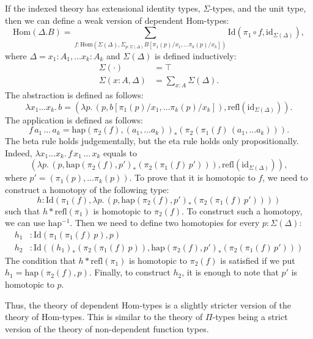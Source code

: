 \documentclass[reqno]{amsart}
\theoremstyle{definition}
\theoremstyle{remark}
\newcommand{\fs}[1]{\mathrm{#1}}
\newcommand{\Hom}{\fs{Hom}}
\newcommand{\Id}{\fs{Id}}
\newcommand{\refl}{\fs{refl}}
\newcommand{\id}{\fs{id}}
\numberwithin{figure}{section}
\begin{document}
If the indexed theory has extensional identity types, $\Sigma$-types, and the unit type, then we can define a weak version of dependent $\Hom$-types:
\[ \Hom(\Delta.B) = \sum_{f : \Hom(\Sigma(\Delta),\Sigma_{p : \Sigma(\Delta)} B[\pi_1(p)/x_1, \ldots \pi_k(p)/x_k])} \Id(\pi_1 \circ f, \id_{\Sigma(\Delta)}), \]
where $\Delta = x_1 : A_1, \ldots x_k : A_k$ and $\Sigma(\Delta)$ is defined inductively:
\begin{align*}
\Sigma(\cdot) & = \top \\
\Sigma(x : A, \Delta) & = \sum_{x : A} \Sigma(\Delta).
\end{align*}
The abstraction is defined as follows:
\[ \lambda x_1 \ldots x_k.\,b = (\lambda p.\,(p, b[\pi_1(p)/x_1, \ldots \pi_k(p)/x_k]), \refl(\id_{\Sigma(\Delta)})). \]
The application is defined as follows:
\[ f\,a_1\,\ldots\,a_k = \fs{hap}(\pi_2(f),(a_1, \ldots a_k))_*(\pi_2(\pi_1(f)\,(a_1, \ldots a_k))). \]
The beta rule holds judgementally, but the eta rule holds only propositionally.
Indeed, $\lambda x_1 \ldots x_k.\,f\,x_1\,\ldots\,x_k$ equals to
\[ (\lambda p.\,(p,\fs{hap}(\pi_2(f),p')_*(\pi_2(\pi_1(f)\,p'))), \refl(\id_{\Sigma(\Delta)})), \]
where $p' = (\pi_1(p), \ldots \pi_k(p))$.
To prove that it is homotopic to $f$, we need to construct a homotopy of the following type:
\[ h : \Id(\pi_1(f), \lambda p.\,(p,\fs{hap}(\pi_2(f),p')_*(\pi_2(\pi_1(f)\,p')))) \]
such that $h * \refl(\pi_1)$ is homotopic to $\pi_2(f)$.
To construct such a homotopy, we can use $\fs{hap^{-1}}$.
Then we need to define two homotopies for every $p : \Sigma(\Delta)$:
\begin{align*}
h_1 & : \Id(\pi_1(\pi_1(f)\,p),p) \\
h_2 & : \Id((h_1)_*(\pi_2(\pi_1(f)\,p)),\fs{hap}(\pi_2(f),p')_*(\pi_2(\pi_1(f)\,p')))
\end{align*}
The condition that $h * \refl(\pi_1)$ is homotopic to $\pi_2(f)$ is satisfied if we put $h_1 = \fs{hap}(\pi_2(f),p)$.
Finally, to construct $h_2$, it is enough to note that $p'$ is homotopic to $p$.

Thus, the theory of dependent $\Hom$-types is a slightly stricter version of the theory of $\Hom$-types.
This is similar to the theory of $\Pi$-types being a strict version of the theory of non-dependent function types.
\end{document}
